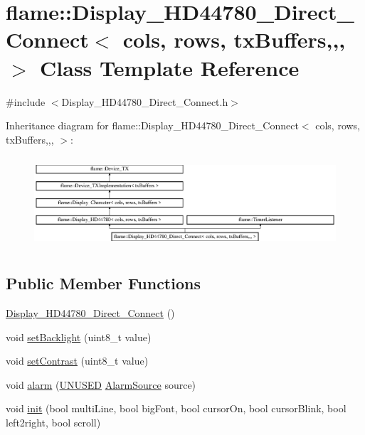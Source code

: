 \hypertarget{classflame_1_1_display___h_d44780___direct___connect}{\section{flame\-:\-:Display\-\_\-\-H\-D44780\-\_\-\-Direct\-\_\-\-Connect$<$ cols, rows, tx\-Buffers,,, $>$ Class Template Reference}
\label{classflame_1_1_display___h_d44780___direct___connect}
}


{\ttfamily \#include $<$Display\-\_\-\-H\-D44780\-\_\-\-Direct\-\_\-\-Connect.\-h$>$}

Inheritance diagram for flame\-:\-:Display\-\_\-\-H\-D44780\-\_\-\-Direct\-\_\-\-Connect$<$ cols, rows, tx\-Buffers,,, $>$\-:\begin{figure}[H]
\begin{center}
\leavevmode
\includegraphics[height=3.439803cm]{classflame_1_1_display___h_d44780___direct___connect}
\end{center}
\end{figure}
\subsection*{Public Member Functions}
\begin{DoxyCompactItemize}
\item 
\hyperlink{classflame_1_1_display___h_d44780___direct___connect_afc5b9ca460d14b1a9f9417adac6045e6}{Display\-\_\-\-H\-D44780\-\_\-\-Direct\-\_\-\-Connect} ()
\item 
void \hyperlink{classflame_1_1_display___h_d44780___direct___connect_a2b3fe7dcd75cdece4c2d4a710dc19543}{set\-Backlight} (uint8\-\_\-t value)
\item 
void \hyperlink{classflame_1_1_display___h_d44780___direct___connect_afe86e7fcf2ac921f21f2bc84fa714bdd}{set\-Contrast} (uint8\-\_\-t value)
\item 
void \hyperlink{classflame_1_1_display___h_d44780___direct___connect_a1ee3e3007aa1c4a39f42306c63392fbe}{alarm} (\hyperlink{io_8h_addf5ec070e9499d36b7f2009ce736076}{U\-N\-U\-S\-E\-D} \hyperlink{namespaceflame_a6d176ba245556716fd3e32006bb7cfe5}{Alarm\-Source} source)
\item 
void \hyperlink{classflame_1_1_display___h_d44780___direct___connect_a92ba7ed48a7b6b04f3b7ce5677720b46}{init} (bool multi\-Line, bool big\-Font, bool cursor\-On, bool cursor\-Blink, bool left2right, bool scroll)
\end{DoxyCompactItemize}
